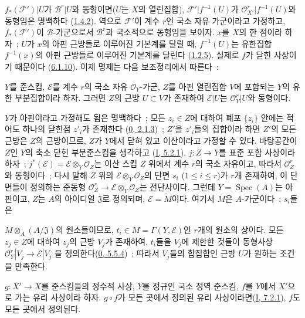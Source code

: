 $f_*(\mathcal{F}')|U$가 $\mathcal{B}^r|U$와 동형이면($U$는 $X$의
열린집합), $\mathcal{F}'|f^{-1}(U)$가
$\mathcal{O}_{X'}^r|f^{-1}(U)$와 동형임은 명백하다
(\hyperref[II.1.4.2-ko]{1.4.2}). 역으로 $\mathcal{F}'$이 계수 $r$인
국소 자유 가군이라고 가정하고, $f_*(\mathcal{F}')$이
$\mathcal{B}$-가군으로서 $\mathcal{B}^r$과 국소적으로 동형임을
보이자. $x$를 $X$의 한 점이라 하자~; $U$가 $x$의 아핀 근방들로
이루어진 기본계를 달릴 때, $f^{-1}(U)$는 유한집합 $f^{-1}(x)$의 아핀
근방들로 이루어진 기본계를 달린다
(\hyperref[II.1.2.5-ko]{1.2.5}). 실제로 $f$가 닫힌 사상이기 때문이다
(\hyperref[II.6.1.10-ko]{6.1.10}). 이제 명제는 다음 보조정리에서
따른다~:

\begin{lemma}[6.1.12.1]
\label{II.6.1.12.1-ko}
$Y$를 준스킴, $\mathcal{E}$를 계수 $r$의 국소 자유
$\mathcal{O}_Y$-가군, $Z$를 아핀 열린집합 $V$에 포함되는 $Y$의 유한
부분집합이라 하자. 그러면 $Z$의 근방 $U\subset V$가 존재하여
$\mathcal{E}|U$는 $\mathcal{O}_Y^r|U$와 동형이다.
\end{lemma}

$Y$가 아핀이라고 가정해도 됨은 명백하다~; 모든 $z_i\in Z$에 대하여
폐포 $\overline{\{z_i\}}$ 안에는 적어도 하나의 닫힌점 $z'_i$가 존재한다
(\hyperref[0.2.1.3-ko]{0, 2.1.3})~; $Z'$을 $z'_i$들의 집합이라 하면
$Z'$의 모든 근방은 $Z$의 근방이므로, $Z$가 $Y$에서 닫혀 있고 이산이라고
가정할 수 있다. 바탕공간이 $Z$인 $Y$의 축소 닫힌 부분준스킴을 생각하고
(\hyperref[I.5.2.1-ko]{I, 5.2.1}), $j:Z\to Y$를 표준 포함 사상이라 하자~;
$j^*(\mathcal{E})=\mathcal{E}\otimes_Y
\mathcal{O}_Z$는 이산 스킴 $Z$ 위에서 계수 $r$의 국소 자유이고,
따라서 $\mathcal{O}_Z^r$와 동형이다~; 다시 말해 $Z$ 위의
$\mathcal{E}\otimes_Y\mathcal{O}_Z$의 단면 $s_i$ ($1\leq i\leq r$)가
$r$개 존재하여, 이 단면들이 정의하는 준동형
$\mathcal{O}_Z^r\to\mathcal{E}\otimes_Y\mathcal{O}_Z$는 전단사이다.
그런데 $Y=\operatorname{Spec}(A)$는 아핀이고, $Z$는 $A$의 아이디얼
$\mathfrak{J}$로 정의되며, $\mathcal{E}=\widetilde{M}$이다. 여기서 $M$은
$A$-가군이다~; $s_i$들은


$M\otimes_A(A/\mathfrak{J})$의 원소들이므로, $t_i\in M=\Gamma(Y,\mathcal{E})$인
$r$개의 원소의 상이다. 모든 $z_j\in Z$에
대하여 $z_j$의 근방 $V_j$가 존재하여, $t_i$들을 $V_j$에 제한한 것들이
동형사상
$\mathcal{O}_Y^r|V_j\to\mathcal{E}|V_j$
을 정의한다(\hyperref[0.5.5.4-ko]{0, 5.5.4})~; 따라서 $V_j$들의 합집합인
근방 $U$가 원하는 조건을 만족한다.

\begin{proposition}[6.1.13]
\label{II.6.1.13-ko}
$g:X'\to X$를 준스킴들의 정수적 사상, $Y$를 정규인 국소 정역 준스킴,
$f$를 $Y$에서 $X'$으로 가는 유리 사상이라 하자. $g\circ f$가 모든 곳에서
정의된 유리 사상이라면(\hyperref[I.7.2.1-ko]{I, 7.2.1}), $f$도 모든
곳에서 정의된다.
\end{proposition}

